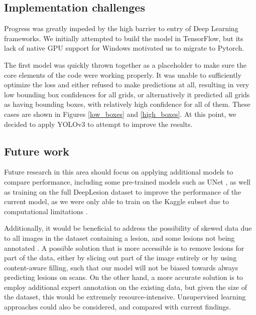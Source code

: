 \subsection{Implementation challenges}
Progress was greatly impeded by the high barrier to entry of Deep Learning frameworks. We initially attempted to build the model in TensorFlow, but its lack of native GPU support for Windows motivated us to migrate to Pytorch. 

The first model was quickly thrown together as a placeholder to make sure the core elements of the code were working properly. It was unable to sufficiently optimize the loss and either refused to make predictions at all, resulting in very low bounding box confidences for all grids, or alternatively it predicted all grids as having bounding boxes, with relatively high confidence for all of them. These cases are shown in Figures \ref{low_boxes} and \ref{high_boxes}. At this point, we decided to apply YOLOv3 to attempt to improve the results.

\subsection{Future work}
Future research in this area should focus on applying additional models to compare performance, including some pre-trained models such as UNet \cite{unet}, as well as training on the full DeepLesion dataset to improve the performance of the current model, as we were only able to train on the Kaggle subset due to computational limitations \cite{kaggle}.

Additionally, it would be beneficial to address the possibility of skewed data due to all images in the dataset containing a lesion, and some lesions not being annotated \cite{deeplesion}. A possible solution that is more accessible is to remove lesions for part of the data, either by slicing out part of the image entirely or by using content-aware filling, such that our model will not be biased towards always predicting lesions on scans. On the other hand, a more accurate solution is to employ additional expert annotation on the existing data, but given the size of the dataset, this would be extremely resource-intensive. Unsupervised learning approaches could also be considered, and compared with current findings.

